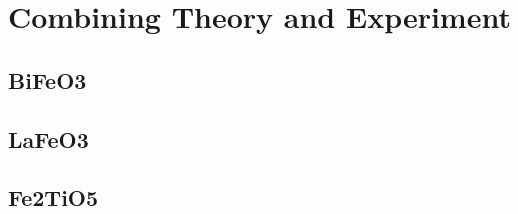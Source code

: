 
\section{Combining Theory and Experiment}
\subsection{BiFeO3}
\subsection{LaFeO3}
\subsection{Fe2TiO5}
